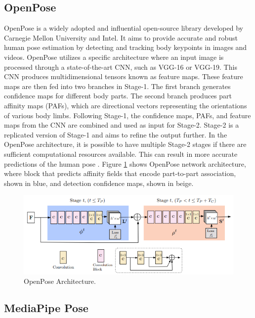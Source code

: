 \subsection{OpenPose}
\label{subsec:openpose}

OpenPose is a widely adopted and influential open-source library developed by Carnegie Mellon University and Intel. It aims to provide accurate and robust human pose estimation by detecting and tracking body keypoints in images and videos.
OpenPose utilizes a specific architecture where an input image is processed through a state-of-the-art CNN, such as VGG-16 or VGG-19. This CNN produces multidimensional tensors known as feature maps. These feature maps are then fed into two branches in Stage-1.
The first branch generates confidence maps for different body parts. The second branch produces part affinity maps (PAFs), which are directional vectors representing the orientations of various body limbs.
Following Stage-1, the confidence maps, PAFs, and feature maps from the CNN are combined and used as input for Stage-2. Stage-2 is a replicated version of Stage-1 and aims to refine the output further. In the OpenPose architecture, it is possible to have multiple Stage-2 stages if there are sufficient computational resources available. This can result in more accurate predictions of the human pose \parencite{cao2019}.
Figure \ref{fig:openpose-architecture} shows OpenPose network architecture, where block that predicts affinity fields that encode part-to-part association, shown in blue, and detection confidence maps, shown in beige.

\begin{figure}[ht]
  \centering
  \includegraphics[scale=1.1]{gambar/openpose_architecture.png}
  \caption{OpenPose Architecture.}
  \label{fig:openpose-architecture}
\end{figure}

\subsection{MediaPipe Pose}
\label{subsec:mediapipepose}

